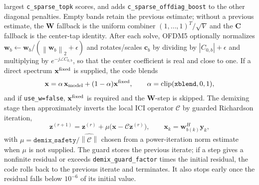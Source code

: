 \documentclass[journal]{IEEEtran}
\newcommand{\norm}[1]{\left\lVert #1 \right\rVert}
\newcommand{\abs}[1]{\left\lvert #1 \right\rvert}
\begin{document}
largest \texttt{c\_sparse\_topk} scores, and adds
\texttt{c\_sparse\_offdiag\_boost} to the other diagonal penalties. Empty bands
retain the previous estimate; without a previous estimate, the \(\mathbf W\)
fallback is the uniform combiner \((1,\ldots,1)^T/\sqrt V\) and the
\(\mathbf C\) fallback is the center-tap identity. After each solve, OFDM5
optionally normalizes
\(\mathbf w_b\leftarrow\mathbf w_b/(\norm{\mathbf w_b}_2+\epsilon)\) and
rotates/scales \(\mathbf c_b\) by dividing by
\(\abs{C_{0,b}}+\epsilon\) and multiplying by \(e^{-j\angle C_{0,b}}\), so that
the center coefficient is real and close to one. If a direct spectrum
\(\mathbf x^{\rm fixed}\) is supplied, the code blends
\begin{equation}
  \mathbf x
  =\alpha\,\mathbf x_{\rm model}+(1-\alpha)\mathbf x^{\rm fixed},
  \qquad
  \alpha=\operatorname{clip}(\texttt{xblend},0,1),
  \label{eq:ofdm5-xblend}
\end{equation}
and if \texttt{use\_w=false}, \(\mathbf x^{\rm fixed}\) is required and the
\(\mathbf W\)-step is skipped. The demixing stage then approximately inverts the
local ICI operator \(\mathcal C\) by guarded Richardson iteration,
\begin{equation}
  \mathbf z^{(r+1)}
  =\mathbf z^{(r)}+\mu\big(\mathbf x-\mathcal C\mathbf z^{(r)}\big),
  \qquad
  \mathbf x_k=\mathbf w_{b(k)}^H\mathbf y_k ,
  \label{eq:ofdm5-richardson}
\end{equation}
with \(\mu=\texttt{demix\_safety}/\widehat{\norm{\mathcal C}}\) chosen from a
power-iteration norm estimate when \(\mu\) is not supplied. The guard stores the
previous iterate; if a step gives a nonfinite residual or exceeds
\texttt{demix\_guard\_factor} times the initial residual, the code rolls back to
the previous iterate and terminates. It also stops early once the residual falls
below \(10^{-6}\) of its initial value.
\end{document}
